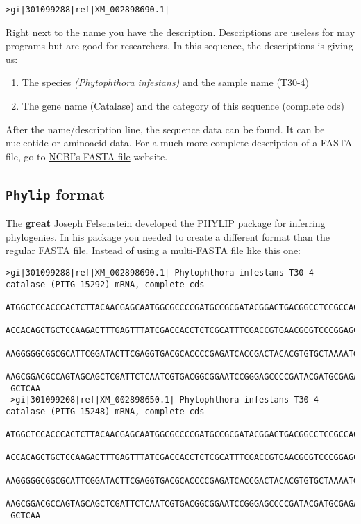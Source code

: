 \documentclass[letterpaper]{article}\usepackage[]{graphicx}\usepackage[]{color}
\makeatletter
\newenvironment{kframe}{%
 \def\at@end@of@kframe{}%
 \ifinner\ifhmode%
  \def\at@end@of@kframe{\end{minipage}}%
  \begin{minipage}{\columnwidth}%
 \fi\fi%
 \def\FrameCommand##1{\hskip\@totalleftmargin \hskip-\fboxsep
 \colorbox{shadecolor}{##1}\hskip-\fboxsep
     \hskip-\linewidth \hskip-\@totalleftmargin \hskip\columnwidth}%
 \MakeFramed {\advance\hsize-\width
   \@totalleftmargin\z@ \linewidth\hsize
   \@setminipage}}%
 {\par\unskip\endMakeFramed%
 \at@end@of@kframe}
\newenvironment{knitrout}{}{} %
\makeatother
\begin{document}
\begin{knitrout}\footnotesize
{}\color{fgcolor}\begin{kframe}
\begin{verbatim}
>gi|301099288|ref|XM_002898690.1|
\end{verbatim}
\end{kframe}
\end{knitrout}


Right next to the name you have the description. Descriptions are useless for may programs but are good for researchers. In this sequence, the descriptions is giving us:

\begin{enumerate}
  \item The species \emph{(Phytophthora infestans)} and the sample name (T30-4)
  \item The gene name (Catalase) and the category of this sequence (complete cds)
\end{enumerate}

After the name/description line, the sequence data can be found. It can be nucleotide or aminoacid data. For a much more complete description of a FASTA file, go to \href{http://www.ncbi.nlm.nih.gov/BLAST/blastcgihelp.shtml}{NCBI's FASTA file} website. 

\subsection{\texttt{Phylip} format}

The \textbf{great} \href{http://www.gs.washington.edu/faculty/felsenstein.htm}{Joseph Felsenstein} developed the PHYLIP package for inferring phylogenies. In his package you needed to create a different format than the regular FASTA file. Instead of using a multi-FASTA file like this one:
\begin{knitrout}\footnotesize
{}\color{fgcolor}\begin{kframe}
\begin{verbatim}
>gi|301099288|ref|XM_002898690.1| Phytophthora infestans T30-4 catalase (PITG_15292) mRNA, complete cds
 ATGGCTCCACCCACTCTTACAACGAGCAATGGCGCCCCGATGCCGCGATACGGACTGACGGCCTCCGCCACTGCTGGGTCCACTGG
 ACCACAGCTGCTCCAAGACTTTGAGTTTATCGACCACCTCTCGCATTTCGACCGTGAACGCGTCCCGGAGCGCGTCGTGCACGCCA
 AAGGGGGCGGCGCATTCGGATACTTCGAGGTGACGCACCCCGAGATCACCGACTACACGTGTGCTAAAATGTTTTCGAATGCCGGC
 AAGCGGACGCCAGTAGCAGCTCGATTCTCAATCGTGACGGCGGAATCCGGGAGCCCCGATACGATGCGAGACCCGCGGGGCTTCGC
 GCTCAA
 >gi|301099208|ref|XM_002898650.1| Phytophthora infestans T30-4 catalase (PITG_15248) mRNA, complete cds
 ATGGCTCCACCCACTCTTACAACGAGCAATGGCGCCCCGATGCCGCGATACGGACTGACGGCCTCCGCCACTGCTGGGTCCACTGG
 ACCACAGCTGCTCCAAGACTTTGAGTTTATCGACCACCTCTCGCATTTCGACCGTGAACGCGTCCCGGAGCGCGTCGTGCACGCCA
 AAGGGGGCGGCGCATTCGGATACTTCGAGGTGACGCACCCCGAGATCACCGACTACACGTGTGCTAAAATGTTTTCGAATGCCGGC
 AAGCGGACGCCAGTAGCAGCTCGATTCTCAATCGTGACGGCGGAATCCGGGAGCCCCGATACGATGCGAGACCCGCGGGGCTTCGC
 GCTCAA
\end{verbatim}
\end{kframe}
\end{knitrout}
\end{document}
